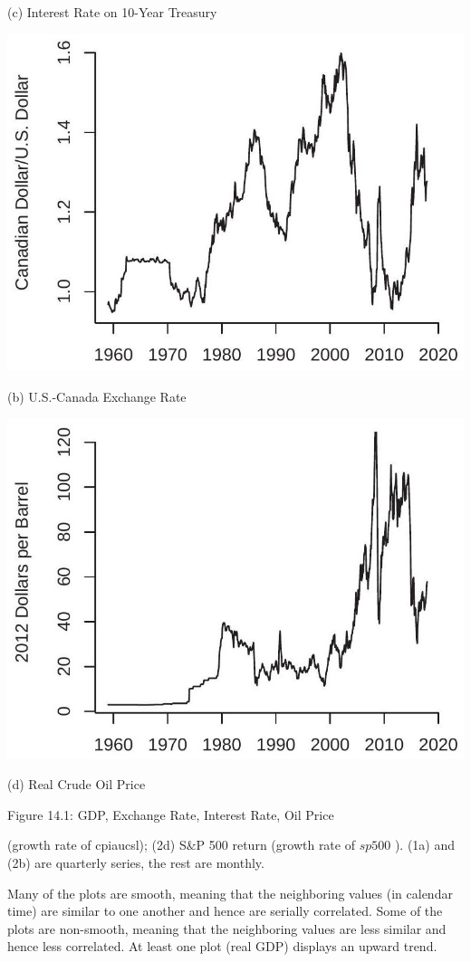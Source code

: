\documentclass[10pt]{article}
\begin{document}
(c) Interest Rate on 10-Year Treasury

\includegraphics[max width=\textwidth]{2022_10_23_6047885e7d154c9f28afg-02(2)}

(b) U.S.-Canada Exchange Rate

\includegraphics[max width=\textwidth]{2022_10_23_6047885e7d154c9f28afg-02(3)}

(d) Real Crude Oil Price

Figure 14.1: GDP, Exchange Rate, Interest Rate, Oil Price

(growth rate of cpiaucsl); (2d) S\&P 500 return (growth rate of $s p 500$ ). (1a) and (2b) are quarterly series, the rest are monthly.

Many of the plots are smooth, meaning that the neighboring values (in calendar time) are similar to one another and hence are serially correlated. Some of the plots are non-smooth, meaning that the neighboring values are less similar and hence less correlated. At least one plot (real GDP) displays an upward trend.
\end{document}
